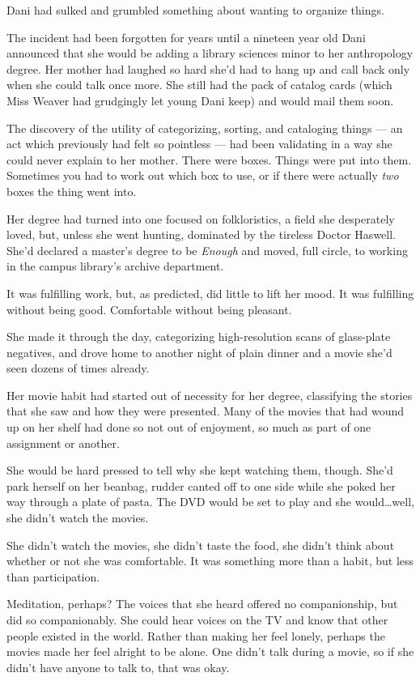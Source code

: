 Dani had sulked and grumbled something about wanting to organize things.

The incident had been forgotten for years until a nineteen year old Dani announced that she would be adding a library sciences minor to her anthropology degree. Her mother had laughed so hard she'd had to hang up and call back only when she could talk once more. She still had the pack of catalog cards (which Miss Weaver had grudgingly let young Dani keep) and would mail them soon.

The discovery of the utility of categorizing, sorting, and cataloging things --- an act which previously had felt so pointless --- had been validating in a way she could never explain to her mother. There were boxes. Things were put into them. Sometimes you had to work out which box to use, or if there were actually \emph{two} boxes the thing went into.

Her degree had turned into one focused on folkloristics, a field she desperately loved, but, unless she went hunting, dominated by the tireless Doctor Haswell. She'd declared a master's degree to be \emph{Enough} and moved, full circle, to working in the campus library's archive department.

It was fulfilling work, but, as predicted, did little to lift her mood. It was fulfilling without being good. Comfortable without being pleasant.

She made it through the day, categorizing high-resolution scans of glass-plate negatives, and drove home to another night of plain dinner and a movie she'd seen dozens of times already.

Her movie habit had started out of necessity for her degree, classifying the stories that she saw and how they were presented. Many of the movies that had wound up on her shelf had done so not out of enjoyment, so much as part of one assignment or another.

She would be hard pressed to tell why she kept watching them, though. She'd park herself on her beanbag, rudder canted off to one side while she poked her way through a plate of pasta. The DVD would be set to play and she would\ldots{}well, she didn't watch the movies.

She didn't watch the movies, she didn't taste the food, she didn't think about whether or not she was comfortable. It was something more than a habit, but less than participation.

Meditation, perhaps? The voices that she heard offered no companionship, but did so companionably. She could hear voices on the TV and know that other people existed in the world. Rather than making her feel lonely, perhaps the movies made her feel alright to be alone. One didn't talk during a movie, so if she didn't have anyone to talk to, that was okay.

